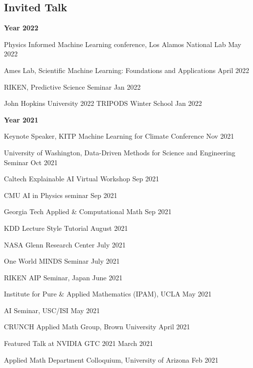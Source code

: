\documentclass[margin,line]{res}
\begin{document}
\begin{resume}





\section{\sc Invited Talk}
 {\bf Year  2022}
 
 
 Physics Informed Machine Learning conference,  Los Alamos National Lab \hfill {May 2022}

Ames Lab, Scientific Machine Learning: Foundations and Applications \hfill{April 2022}
 
 RIKEN, Predictive Science Seminar \hfill{Jan 2022}
 
 John Hopkins University 2022 TRIPODS Winter School \hfill{Jan 2022}
 
 {\bf Year  2021}

Keynote Speaker,   KITP Machine Learning for Climate Conference \hfill{Nov 2021}

University of Washington,  Data-Driven Methods for Science and Engineering Seminar  \hfill{Oct 2021}

Caltech Explainable AI Virtual Workshop  \hfill{Sep 2021}


 CMU AI in Physics seminar \hfill{Sep 2021}
 
 Georgia Tech Applied \& Computational Math \hfill{Sep 2021}

 KDD Lecture Style Tutorial \hfill{August 2021}
 

 
NASA Glenn Research Center \hfill{July 2021}
 
One World MINDS Seminar \hfill{July 2021}

RIKEN AIP Seminar, Japan  \hfill{June 2021}
  
Institute for Pure \& Applied Mathematics (IPAM), UCLA \hfill{May 2021}

AI Seminar, USC/ISI \hfill{May 2021}

CRUNCH Applied Math Group,  Brown University \hfill{April 2021}
 
 Featured Talk at NVIDIA GTC 2021   \hfill{March 2021}
  
 Applied Math Department Colloquium, University of Arizona   \hfill{Feb 2021}
  

\end{resume}
\end{document}
